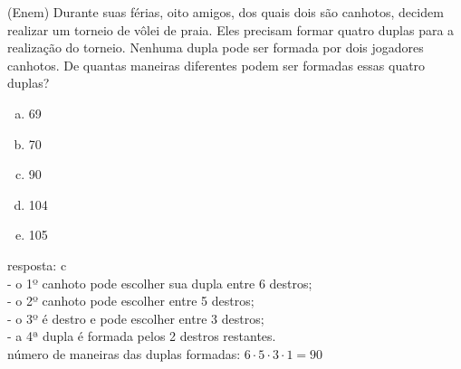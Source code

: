 \begin{ex}
  (Enem) Durante suas férias, oito amigos, dos quais dois são canhotos, decidem realizar um torneio de vôlei de praia. Eles precisam formar quatro duplas para a realização do torneio. Nenhuma dupla pode ser formada por dois jogadores canhotos. De quantas maneiras diferentes podem ser formadas essas quatro duplas? 
    \begin{enumerate} [(a)]
        \item 69
        \item 70
        \item 90
        \item 104
        \item 105
    \end{enumerate}
      \begin{sol}
      resposta: c \\
       - o 1º canhoto pode escolher sua dupla entre 6 destros;\\
       - o 2º canhoto pode escolher entre 5 destros; \\
       - o 3º é destro e pode escolher entre 3 destros;\\
       - a 4ª dupla é formada pelos 2 destros restantes.\\
       número de maneiras das duplas formadas: $6\cdot5\cdot3\cdot1=90$
      \end{sol}
 \end{ex}